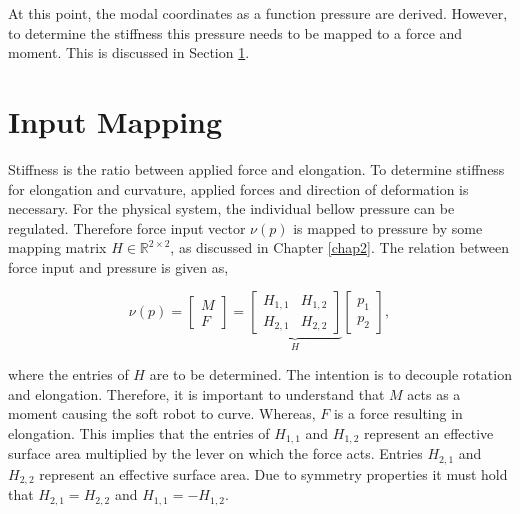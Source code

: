 At this point, the modal coordinates as a function pressure are derived. However, to determine the stiffness this pressure needs to be mapped to a force and moment. This is discussed in Section \ref{sec3:InputMapping}.






\section{Input Mapping}
\label{sec3:InputMapping}

Stiffness is the ratio between applied force and elongation. To determine stiffness for elongation and curvature, applied forces and direction of deformation is necessary. For the physical system, the individual bellow pressure can be regulated. Therefore force input vector $\nu(p)$ is mapped to pressure by some mapping matrix $H \in \mathbb{R}^{2 \times 2}$, as discussed in Chapter \ref{chap2}. The relation between force input and pressure is given as, 

\begin{equation}
   \nu(p) =   \begin{bmatrix} M \\ F \end{bmatrix}     = \underbrace{\begin{bmatrix}  H_{1,1} & H_{1,2} \\ H_{2,1} & H_{2,2} \end{bmatrix}}_{H}         \begin{bmatrix}  p_1 \\ p_2 \end{bmatrix}, \label{eq3:H}
\end{equation}

where the entries of $H$ are to be determined. The intention is to decouple rotation and elongation. Therefore, it is important to understand that $M$ acts as a moment causing the soft robot to curve. Whereas, $F$ is a force resulting in elongation. This implies that the entries of $H_{1,1}$ and $H_{1,2}$ represent an effective surface area multiplied by the lever on which the force acts. Entries $H_{2,1}$ and $H_{2,2}$ represent an effective surface area. Due to symmetry properties it must hold that $H_{2,1} = H_{2,2}$ and $H_{1,1} = -H_{1,2}$.

